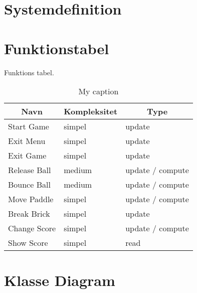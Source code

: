 
\section{Systemdefinition}

\section{Funktionstabel}
Funktions tabel.
\begin{table}[]
\centering
\caption{My caption}
\label{my-label}
\begin{tabular}{lll}
\multicolumn{1}{c}{Navn}          & \multicolumn{1}{c}{Kompleksitet} & \multicolumn{1}{c}{Type} \\ \hline
\multicolumn{1}{l|}{Start Game}   & \multicolumn{1}{l|}{simpel}      & update                   \\
\multicolumn{1}{l|}{Exit Menu}    & \multicolumn{1}{l|}{simpel}      & update                   \\
\multicolumn{1}{l|}{Exit Game}    & \multicolumn{1}{l|}{simpel}      & update                   \\
\multicolumn{1}{l|}{Release Ball} & \multicolumn{1}{l|}{medium}      & update / compute         \\
\multicolumn{1}{l|}{Bounce Ball}  & \multicolumn{1}{l|}{medium}      & update / compute         \\
\multicolumn{1}{l|}{Move Paddle}  & \multicolumn{1}{l|}{simpel}      & update / compute         \\
\multicolumn{1}{l|}{Break Brick}  & \multicolumn{1}{l|}{simpel}      & update                   \\
\multicolumn{1}{l|}{Change Score} & \multicolumn{1}{l|}{simpel}      & update / compute         \\
\multicolumn{1}{l|}{Show Score}   & \multicolumn{1}{l|}{simpel}      & read                    
\end{tabular}
\end{table}

\section{Klasse Diagram}

